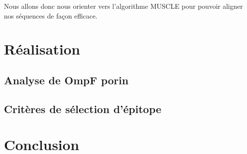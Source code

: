 \documentclass{article}
\begin{document}
Nous allons donc nous orienter vers l'algorithme MUSCLE pour pouvoir aligner nos séquences de façon efficace.






  \section{Réalisation}
  
    \subsection{Analyse de OmpF porin}
    
    \subsection{Critères de sélection d'épitope}
  
  \section{Conclusion}
\end{document}
